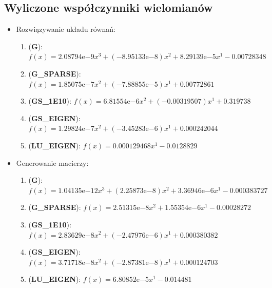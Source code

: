 \documentclass[10pt]{article}
\newcommand{\expnumber}[2]{{#1}\mathrm{e}{#2}}
\begin{document}
\subsection{Wyliczone współczynniki wielomianów}
\begin{itemize}
	\item Rozwiązywanie układu równań:
	\begin{enumerate}
		\item (\textbf{G}): $f(x) = \expnumber{2.08794}{-9} x^3 + (\expnumber{-8.95133}{-8}) x^2 + \expnumber{8.29139}{-5} x^1 - 0.00728348$
		\item (\textbf{G\_SPARSE}): $f(x) = \expnumber{1.85075}{-7} x^2 + (\expnumber{-7.88855}{-5}) x^1 + 0.00772861$
		\item (\textbf{GS\_1E10}): $f(x) = \expnumber{6.81554}{-6} x^2 + (-0.00319507) x^1 + 0.319738$
		\item (\textbf{GS\_EIGEN}): $f(x) = \expnumber{1.29824}{-7} x^2 + (\expnumber{-3.45283}{-6}) x^1 + 0.000242044$
		\item (\textbf{LU\_EIGEN}): $f(x) = 0.000129468 x^1 - 0.0128829$
	\end{enumerate}
	\item Generowanie macierzy:
	\begin{enumerate}
		\item (\textbf{G}): $f(x) = \expnumber{1.04135}{-12} x^3 + (\expnumber{2.25873}{-8}) x^2 + \expnumber{3.36946}{-6} x^1 - 0.000383727$
		\item (\textbf{G\_SPARSE}): $f(x) = \expnumber{2.51315}{-8} x^2 + \expnumber{1.55354}{-6} x^1 - 0.00028272$
		\item (\textbf{GS\_1E10}): $f(x) = \expnumber{2.83629}{-8} x^2 + (\expnumber{-2.47976}{-6}) x^1 + 0.000380382$
		\item (\textbf{GS\_EIGEN}): $f(x) = \expnumber{3.71718}{-8} x^2 + (\expnumber{-2.87381}{-8}) x^1 + 0.000124703$
		\item (\textbf{LU\_EIGEN}): $f(x) = \expnumber{6.80852}{-5} x^1 - 0.014481$
	\end{enumerate}
\end{itemize}
\end{document}
